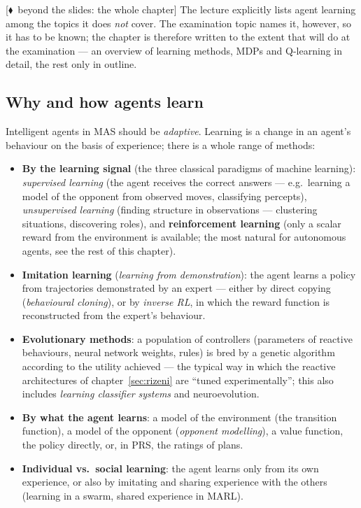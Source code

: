 \documentclass[11pt,a4paper]{article}
\theoremstyle{definition}
\providecommand{\uv}[1]{``#1''}
\newcommand{\mimoq}[1]{\textcolor{markcol}{\textsf{\footnotesize[$\blacklozenge$~beyond the slides: #1]}}}
\begin{document}
\noindent\mimoq{the whole chapter} The lecture explicitly lists agent learning among the topics
it does \emph{not} cover. The examination topic names it, however, so it has to be known; the
chapter is therefore written to the extent that will do at the examination --- an overview of
learning methods, MDPs and Q-learning in detail, the rest only in outline.
\subsection{Why and how agents learn}

Intelligent agents in MAS should be \emph{adaptive}. Learning is a change in an agent's behaviour on
the basis of experience; there is a whole range of methods:

\begin{defbox}
\begin{itemize}
\item \textbf{By the learning signal} (the three classical paradigms of machine learning):
  \emph{supervised learning} (the agent receives the correct answers --- e.g.\ learning a model of the
  opponent from observed moves, classifying percepts), \emph{unsupervised learning}
  (finding structure in observations --- clustering situations, discovering roles),
  and \textbf{reinforcement learning} (only a scalar reward from the environment is available;
  the most natural for autonomous agents, see the rest of this chapter).
\item \textbf{Imitation learning} (\emph{learning from demonstration}): the agent learns a
  policy from trajectories demonstrated by an expert --- either by direct copying
  (\emph{behavioural cloning}), or by \emph{inverse RL}, in which the reward function is
  reconstructed from the expert's behaviour.
\item \textbf{Evolutionary methods}: a population of controllers (parameters of reactive behaviours,
  neural network weights, rules) is bred by a genetic algorithm according to the utility
  achieved --- the typical way in which the reactive architectures of
  chapter~\ref{sec:rizeni} are \uv{tuned experimentally}; this also includes \emph{learning
  classifier systems} and neuroevolution.
\item \textbf{By what the agent learns}: a model of the environment (the transition function),
  a model of the opponent (\emph{opponent modelling}), a value function, the policy directly,
  or, in PRS, the ratings of plans.
\item \textbf{Individual vs.\ social learning}: the agent learns only from its own
  experience, or also by imitating and sharing experience with the others (learning
  in a swarm, shared experience in MARL).
\end{itemize}
\end{defbox}
\end{document}
